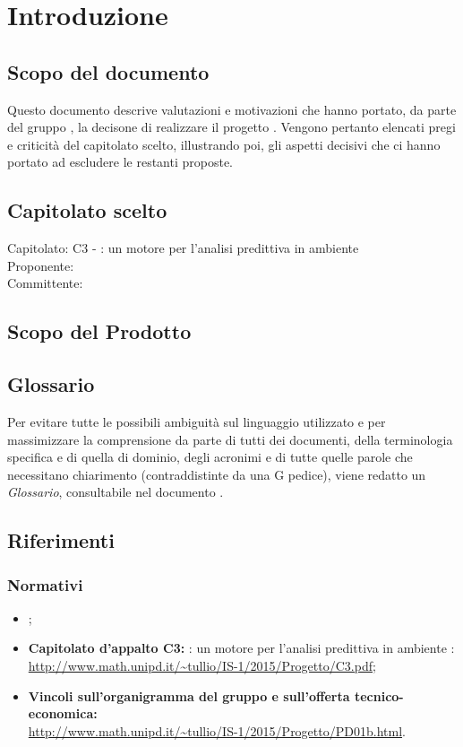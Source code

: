 \section{Introduzione}

\subsection{Scopo del documento}
Questo documento descrive valutazioni e motivazioni che hanno portato, da parte del gruppo \GroupName{}, la decisone di realizzare il progetto \ProjectName{}. 
Vengono pertanto elencati pregi e criticità del capitolato scelto, illustrando poi, gli aspetti decisivi che ci hanno portato ad escludere le restanti proposte. 

\subsection{Capitolato scelto}
Capitolato: C3 - \ProjectName{}: un motore per l'analisi predittiva in ambiente \\
Proponente: \Proponente{} \\
Committente: \Committente{} \\

\subsection{Scopo del Prodotto}
\ScopoDelProdotto

\subsection{Glossario}
Per evitare tutte le possibili ambiguità sul linguaggio utilizzato e per massimizzare la comprensione da parte di tutti dei documenti, della terminologia specifica e di quella di dominio, degli acronimi e di tutte quelle parole che necessitano chiarimento (contraddistinte da una G pedice), viene redatto un \textit{Glossario}, consultabile nel documento \Glossario.

\subsection{Riferimenti}
\subsubsection{Normativi}
\begin{itemize}
	\item \textbf{\NormeDiProgetto};
	\item\textbf{ Capitolato d'appalto C3:} \ProjectName{}: un motore per l'analisi predittiva in ambiente : \url{http://www.math.unipd.it/~tullio/IS-1/2015/Progetto/C3.pdf};
	\item \textbf{Vincoli sull'organigramma del gruppo e sull'offerta tecnico-economica:} \\ \url{http://www.math.unipd.it/~tullio/IS-1/2015/Progetto/PD01b.html}.
\end{itemize}

